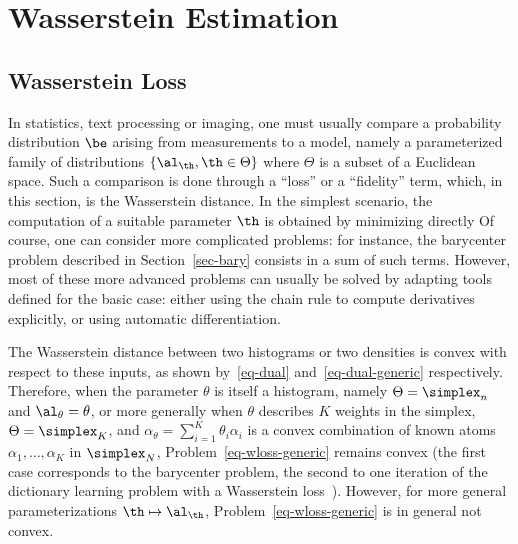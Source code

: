 

\section{Wasserstein Estimation}


\subsection{Wasserstein Loss}

In statistics, text processing or imaging, one must usually compare a probability distribution $\be$ arising from measurements to a model, namely a parameterized family of distributions $\{\al_\th,\th\in\Theta\}$ where $\Theta$ is a subset of a Euclidean space. Such a comparison is done through a ``loss'' or a ``fidelity'' term, which, in this section, is the Wasserstein distance.
%
In the simplest scenario, the computation of a suitable parameter $\th$ is obtained by minimizing directly
Of course, one can consider more complicated problems: for instance, the barycenter problem described in Section~\ref{sec-bary} consists in a sum of such terms. However, most of these more advanced problems can usually be solved by adapting tools defined for the basic case: either using the chain rule to compute derivatives explicitly, or using automatic differentiation. %

The Wasserstein distance between two histograms or two densities is convex with respect to these inputs, as shown by~\eqref{eq-dual} and~\eqref{eq-dual-generic} respectively. Therefore, when the parameter $\theta$ is itself a histogram, namely $\Theta=\simplex_n$ and $\al_\theta=\theta$, or more generally when $\theta$ describes $K$ weights in the simplex, $\Theta=\simplex_K$, and $\alpha_\theta=\sum_{i=1}^K \theta_i \alpha_i$ is a convex combination of known atoms $\alpha_1,\dots,\alpha_K$ in $\simplex_N$, Problem~\eqref{eq-wloss-generic} remains convex (the first case corresponds to the barycenter problem, the second to one iteration of the dictionary learning problem with a Wasserstein loss~\cite{pmlr-v51-rolet16}). However, for more general parameterizations $\th\mapsto \al_\th$, Problem~\eqref{eq-wloss-generic} is in general not convex.


